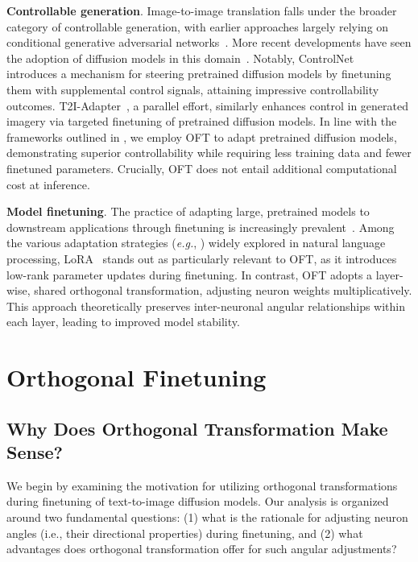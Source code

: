 \textbf{Controllable generation}. Image-to-image translation falls under the broader category of controllable generation, with earlier approaches largely relying on conditional generative adversarial networks~\cite{isola2017image,zhu2017toward,wang2018high,park2019semantic,choi2018stargan}. More recent developments have seen the adoption of diffusion models in this domain~\cite{saharia2022palette,voynov2022sketch,wang2022pretraining}. Notably, ControlNet~\cite{zhang2023adding} introduces a mechanism for steering pretrained diffusion models by finetuning them with supplemental control signals, attaining impressive controllability outcomes. T2I-Adapter~\cite{mou2023t2i}, a parallel effort, similarly enhances control in generated imagery via targeted finetuning of pretrained diffusion models. In line with the frameworks outlined in \cite{zhang2023adding,mou2023t2i}, we employ OFT to adapt pretrained diffusion models, demonstrating superior controllability while requiring less training data and fewer finetuned parameters. Crucially, OFT does not entail additional computational cost at inference.

\textbf{Model finetuning}. The practice of adapting large, pretrained models to downstream applications through finetuning is increasingly prevalent~\cite{devlin2018bert,brown2020language,he2022masked}. Among the various adaptation strategies (\emph{e.g.}, \cite{hulora2022,houlsby2019parameter,pfeiffer2020adapterfusion}) widely explored in natural language processing, LoRA~\cite{hulora2022} stands out as particularly relevant to OFT, as it introduces low-rank parameter updates during finetuning. In contrast, OFT adopts a layer-wise, shared orthogonal transformation, adjusting neuron weights multiplicatively. This approach theoretically preserves inter-neuronal angular relationships within each layer, leading to improved model stability.

\section{Orthogonal Finetuning}

\subsection{Why Does Orthogonal Transformation Make Sense?}

We begin by examining the motivation for utilizing orthogonal transformations during finetuning of text-to-image diffusion models. Our analysis is organized around two fundamental questions: (1) what is the rationale for adjusting neuron angles (i.e., their directional properties) during finetuning, and (2) what advantages does orthogonal transformation offer for such angular adjustments?

